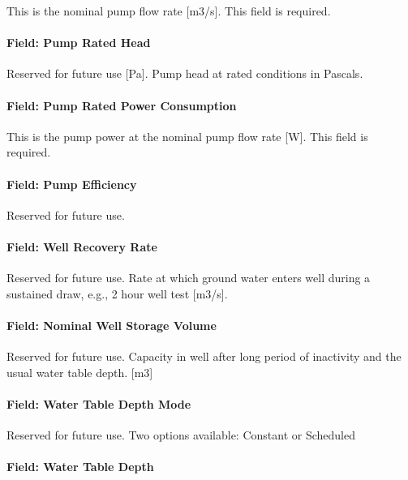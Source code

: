 This is the nominal pump flow rate {[}m3/s{]}. This field is required.

\paragraph{Field: Pump Rated Head}\label{field-pump-rated-head}

Reserved for future use {[}Pa{]}. Pump head at rated conditions in Pascals.

\paragraph{Field: Pump Rated Power Consumption}\label{field-pump-rated-power-consumption}

This is the pump power at the nominal pump flow rate {[}W{]}. This field is required.

\paragraph{Field: Pump Efficiency}\label{field-pump-efficiency}

Reserved for future use.

\paragraph{Field: Well Recovery Rate}\label{field-well-recovery-rate}

Reserved for future use. Rate at which ground water enters well during a sustained draw, e.g., 2 hour well test {[}m3/s{]}.

\paragraph{Field: Nominal Well Storage Volume}\label{field-nominal-well-storage-volume}

Reserved for future use. Capacity in well after long period of inactivity and the usual water table depth. {[}m3{]}

\paragraph{Field: Water Table Depth Mode}\label{field-water-table-depth-mode}

Reserved for future use. Two options available: Constant or Scheduled

\paragraph{Field: Water Table Depth}\label{field-water-table-depth}


